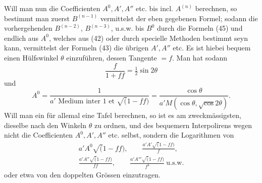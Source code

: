 \begingroup
\makeatletter\tagsleft@true\let\veqno\@@leqno\makeatother
{}
Will man nun die Coefficienten $A^0,A',A''$ etc. bis incl. $A^{(n)}$ berechnen, so bestimmt man zuerst $B^{(n-1)}$ vermittelst der eben gegebenen Formel; sodann die vorhergehenden $B^{(n-2)}$, $B^{(n-3)}$, u.s.w. bis $B^0$ durch die Formeln (45) und endlich aus $A^0$, welches aus (42) oder durch specielle Methoden bestimmt seyn kann, vermittelst der Formeln (43) die übrigen $A',A''$ etc. Es ist hiebei bequem einen Hülfswinkel $\theta$ einzuführen, dessen Tangente $=f$. Man hat sodann
\[\frac{f}{1+ff}=\tfrac12\sin2\theta\]
\noindent und
\[
A^0=\frac{1}{a'\text{ Medium inter 1 et }\surd(1-ff)}
=\frac{\cos\theta}{a'M(\cos\theta,\surd\cos2\theta)}.
\]
\noindent Will man ein für allemal eine Tafel berechnen, so ist es am zweckmässigsten, dieselbe nach den Winkeln $\theta$ zu ordnen, und des bequemern Interpolirens wegen nicht die Coefficienten $A^0,A',A''$ etc. selbst, sondern die Logarithmen von
\[
\begin{gathered}
a'A^0\surd(1-ff),\qquad\frac{a'A'\surd(1-ff)}{f},\\[1ex]
\frac{a'A''\surd(1-ff)}{ff},\qquad\frac{a'A'''\surd(1-ff)}{f^3}\ \text{u.s.w.}
\end{gathered}
\]
\noindent oder etwa von den doppelten Grössen einzutragen.

